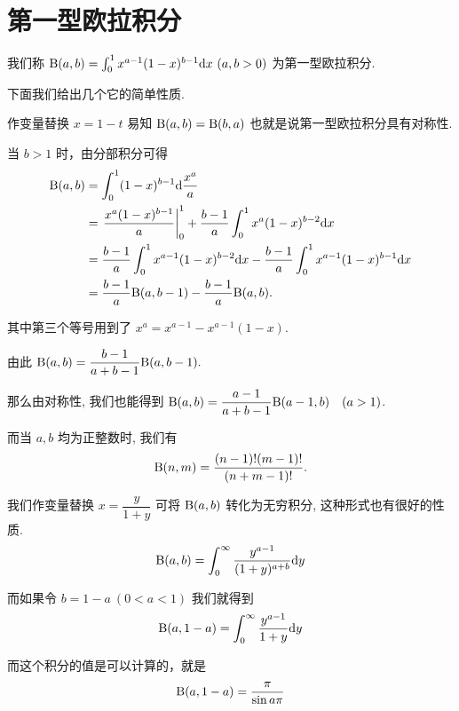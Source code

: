 \newpage
\specialtrue
{}
\section{第一型欧拉积分}

\begin{definition}
	我们称 $\text B(a,b)=\int_0^1 x^{a-1}(1-x)^{b-1}\text{d} x\ (a,b>0)$ 为第一型欧拉积分.
\end{definition}

下面我们给出几个它的简单性质.

\begin{property}
	作变量替换 $x=1-t$ 易知 $\text B(a,b)=\text B(b,a)$ 也就是说第一型欧拉积分具有对称性.
\end{property}

\begin{property}
	当 $b>1$ 时，由分部积分可得
	$$
	\begin{aligned}
		\text B(a,b) &= \int_0^1 (1-x)^{b-1} \text{d}\frac{x^a}{a}\\
		&= \left.\dfrac{x^a(1-x)^{b-1}}{a}\right|_0^1+\dfrac{b-1}{a}\int_0^1 x^{a}(1-x)^{b-2}\text{d}x\\
		&= \dfrac{b-1}{a}\int_0^1 x^{a-1}(1-x)^{b-2}\text{d} x - \dfrac{b-1}{a}\int_0^1 x^{a-1}(1-x)^{b-1} \text{d}x\\
		&= \dfrac{b-1}{a}\text B(a,b-1)-\dfrac{b-1}a \text B(a,b).
	\end{aligned}
	$$

	其中第三个等号用到了 $x^a=x^{a-1}-x^{a-1}(1-x)$.

	由此 $\text B(a,b)=\dfrac{b-1}{a+b-1}\text B(a,b-1).$

	那么由对称性, 我们也能得到 $\text B(a,b)=\dfrac{a-1}{a+b-1}\text B(a-1,b)\quad(a>1)$.

	而当 $a,b$ 均为正整数时, 我们有 $$\text B(n,m)=\dfrac{(n-1)!(m-1)!}{(n+m-1)!}.$$


\end{property}

\begin{property}
	我们作变量替换 $x=\dfrac{y}{1+y}$ 可将 $\text {B}(a,b)$ 转化为无穷积分, 这种形式也有很好的性质.
	$$\text {B}(a,b)=\int_0^\infty \dfrac{y^{a-1}}{(1+y)^{a+b}}\text {d} y$$

	而如果令 $b=1-a \ (0<a<1)$ 我们就得到
	$$\text {B}(a,1-a)=\int_0^\infty \dfrac{y^{a-1}}{1+y} \text {d} y$$

	而这个积分的值是可以计算的，就是
	$$\text {B}(a,1-a)=\dfrac{\pi}{\sin a\pi}$$
\end{property}




